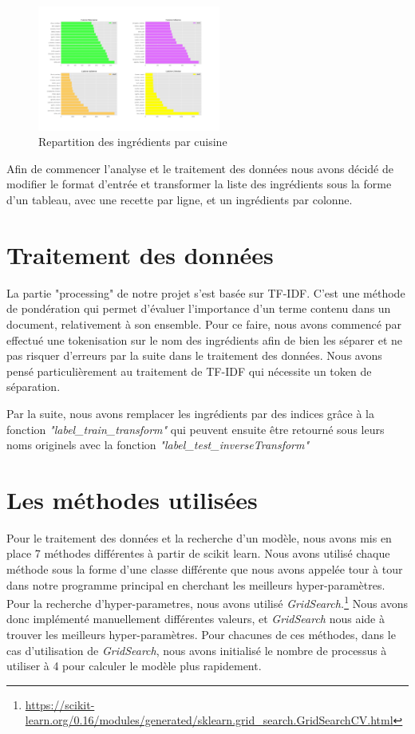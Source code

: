 \documentclass[12pt]{article}
\begin{document}
\begin{figure}
	\includegraphics[width=6cm]{./exemple_differences_ingredients.png}
	\caption{Repartition des ingrédients par cuisine}
	\label{label-image2}
\end{figure}
Afin de commencer l'analyse et le traitement des données nous avons décidé de modifier le format d'entrée et transformer la liste des ingrédients sous la forme d'un tableau, avec une recette par ligne, et un ingrédients par colonne.

\newpage
\section{Traitement des données}
La partie "processing" de notre projet s'est basée sur TF-IDF. C'est une méthode de pondération qui permet d'évaluer l'importance d'un terme contenu dans un document, relativement à son ensemble. Pour ce faire, nous avons commencé par effectué une tokenisation sur le nom des ingrédients afin de bien les séparer et ne pas risquer d'erreurs par la suite dans le traitement des données. Nous avons pensé particulièrement au traitement de TF-IDF qui nécessite un token de séparation.

Par la suite, nous avons remplacer les ingrédients par des indices grâce à la fonction \textit{"label\_train\_transform"} qui peuvent ensuite être retourné sous leurs noms originels avec la fonction \textit{"label\_test\_inverseTransform"}




\section{Les méthodes utilisées\label{methodes}}
Pour le traitement des données et la recherche d'un modèle, nous avons mis en place 7 méthodes différentes à partir de scikit learn. Nous avons utilisé chaque méthode sous la forme d'une classe différente que nous avons appelée tour à tour dans notre programme principal en cherchant les meilleurs hyper-paramètres. Pour la recherche d'hyper-parametres, nous avons utilisé \textit{GridSearch.}\footnote{\url{https://scikit-learn.org/0.16/modules/generated/sklearn.grid_search.GridSearchCV.html}} Nous avons donc implémenté manuellement différentes valeurs, et \textit{GridSearch} nous aide à trouver les meilleurs hyper-paramètres. Pour chacunes de ces méthodes, dans le cas d'utilisation de \textit{GridSearch}, nous avons initialisé le nombre de processus à utiliser à 4 pour calculer le modèle plus rapidement. 
\end{document}
